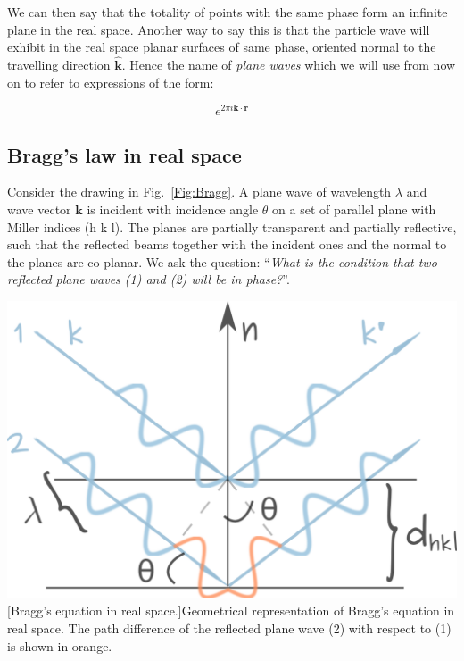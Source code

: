 \vspace*{0.3cm}

We can then say that the totality of points with the same phase form an infinite plane in the real space. Another way to say this is that the particle wave will exhibit in the real space planar surfaces of same phase, oriented normal to the travelling direction $\mathbf{\hat{k}}$. Hence the name of \textit{plane waves} which we will use from now on to refer to expressions of the form:

\begin{equation}
e^{2 \pi i  \mathbf{k} \cdot \mathbf{r}}
\end{equation}






\subsection{Bragg's law in real space}
\label{Sec:Bragg}

\begin{minipage}{0.5\textwidth}
Consider the drawing in Fig.~\ref{Fig:Bragg}. A plane wave of wavelength $\lambda$ and wave vector $\mathbf{k}$ is incident with incidence angle $\theta$ on a set of parallel plane with Miller indices \hkl(h k l). The planes are partially transparent and partially reflective, such that the reflected beams together with the incident ones and the normal to the planes are co-planar. We ask the question: ``\textit{What is the condition that two reflected plane waves (1) and (2) will be in phase?}''. 
\end{minipage}
\begin{minipage}{0.5\textwidth}
    \centering
\captionsetup{width=.7\linewidth}
\includegraphics[width=0.8\linewidth]{Figures/Bragg.png}
[Bragg's equation in real space.]{Geometrical representation of Bragg's equation in real space. The path difference of the reflected plane wave (2) with respect to (1) is shown in orange.}
\label{Fig:Bragg}
\end{minipage}

